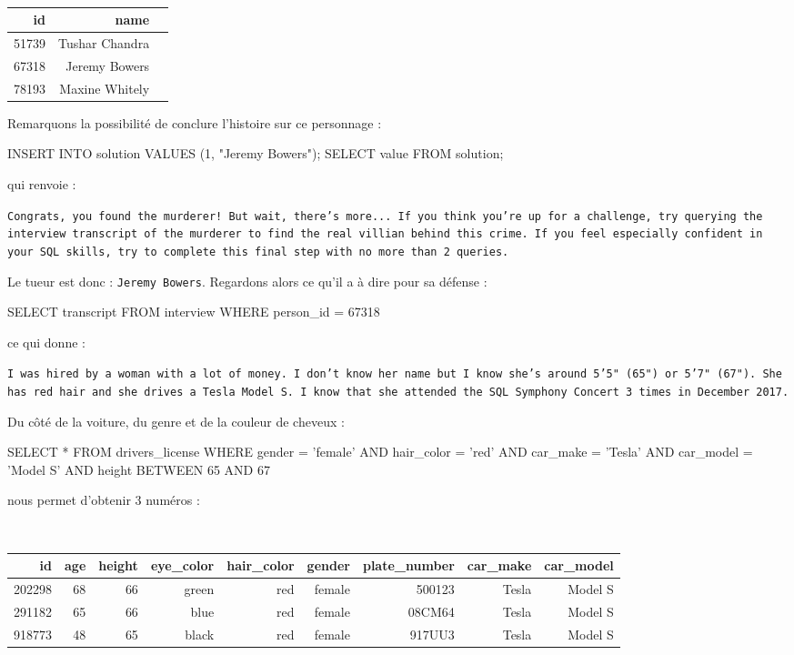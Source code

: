 \documentclass[10pt]{article}
\begin{document}
\begin{table}[!htp]
\centering
{\tt
\begin{tabular}{rrr}
id& name \\ \hline
51739& Tushar Chandra \\
67318& Jeremy Bowers \\
78193& Maxine Whitely\\
\end{tabular}
}
\end{table}



Remarquons la possibilité de conclure l'histoire sur ce personnage :
\begin{sql}
INSERT INTO solution VALUES (1, "Jeremy Bowers");
SELECT value FROM solution;
\end{sql}
qui renvoie : 

{\tt Congrats, you found the murderer! But wait, there's more... If you think you're up for a challenge, try querying the interview transcript of the murderer to find the real villian behind this crime. If you feel especially confident in your SQL skills, try to complete this final step with no more than 2 queries. }



Le tueur est donc : \texttt{Jeremy Bowers}. Regardons alors ce qu'il a à dire pour sa défense :

\begin{sql}
SELECT transcript FROM interview WHERE person_id = 67318
\end{sql}
ce qui donne :

{\tt I was hired by a woman with a lot of money. I don't know her name but I know she's around 5'5" (65") or 5'7" (67"). She has red hair and she drives a Tesla Model S. I know that she attended the SQL Symphony Concert 3 times in December 2017.}


Du côté de la voiture, du genre et de la couleur de cheveux :
\begin{sql}
SELECT * FROM drivers_license
WHERE gender = 'female' AND hair_color = 'red' 
AND car_make = 'Tesla' AND car_model = 'Model S' 
AND height BETWEEN 65 AND 67 
\end{sql}
nous permet d'obtenir 3 numéros :

\begin{table}[!htp]
\centering
{\tt
\begin{tabular}{rrrrrrrrr}
id& age& height& eye\_color& hair\_color& gender& plate\_number& car\_make& car\_model \\ \hline
202298& 68& 66& green& red& female& 500123& Tesla& Model S \\
291182& 65& 66& blue& red& female& 08CM64& Tesla& Model S \\
918773& 48& 65& black& red& female& 917UU3& Tesla& Model S \\
\end{tabular}
}
\end{table}
\end{document}
